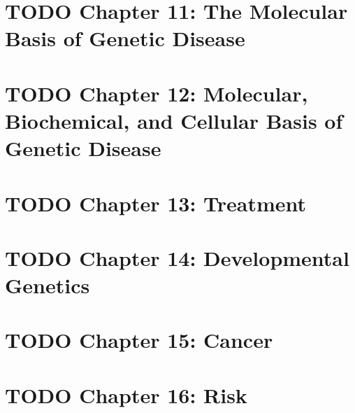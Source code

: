 \documentclass{scrartcl}
\begin{document}
\section{{\bfseries\sffamily TODO} Chapter 11: The Molecular Basis of Genetic Disease}
\label{sec:orgd7706b3}
\section{{\bfseries\sffamily TODO} Chapter 12: Molecular, Biochemical, and Cellular Basis of Genetic Disease}
\label{sec:org503f0c1}
\section{{\bfseries\sffamily TODO} Chapter 13: Treatment}
\label{sec:org5a4f89d}
\section{{\bfseries\sffamily TODO} Chapter 14: Developmental Genetics}
\label{sec:org31faf79}
\section{{\bfseries\sffamily TODO} Chapter 15: Cancer}
\label{sec:org74ee504}
\section{{\bfseries\sffamily TODO} Chapter 16: Risk}
\label{sec:org33cd99a}
\end{document}
